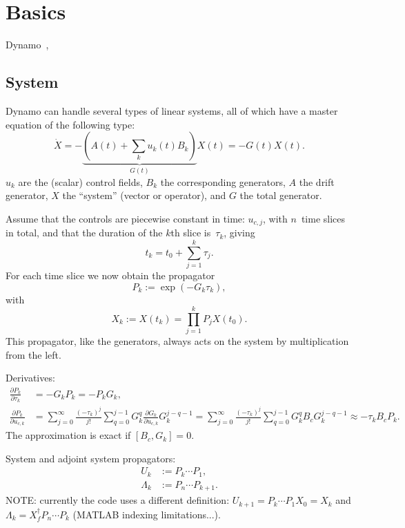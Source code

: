 \documentclass[aps, pra, a4paper, longbibliography]{revtex4}
\newcommand{\be}{\begin{equation}}
\newcommand{\ee}{\end{equation}}
\newcommand{\comm}[2]{\left[ #1, #2 \right]}
\newcommand{\dd}[2]{\frac{\partial #1}{\partial #2}}
\begin{document}
\tableofcontents

\section{Basics}

Dynamo~\cite{machnes_2011},


\subsection{System}

Dynamo can handle several types of linear systems, all of which have a
master equation of the following type:
\be
\label{eq:master}
\dot{X} = -\underbrace{(A(t) +\sum_k u_k(t) B_k)}_{G(t)} X(t) = -G(t) X(t).
\ee
$u_k$ are the (scalar) control fields, $B_k$ the corresponding generators,
$A$ the drift generator, $X$ the ``system'' (vector or operator), and $G$ the total generator.

Assume that the controls are
piecewise constant in time: $u_{c,j}$, with $n$~time slices in total,
and that the duration of the $k$th slice is~$\tau_k$, giving
\be
t_k = t_0 + \sum_{j=1}^{k} \tau_j.
\ee
For each time slice we now obtain the propagator
\be
P_k := \exp(-G_k \tau_k),
\ee
with
\be
X_k := X(t_k) = \prod_{j=1}^{k} P_j X(t_0).
\ee
This propagator, like the generators, always acts on the system by multiplication
from the left.

Derivatives:
\begin{align}
\dd{P_k}{\tau_k}  &= -G_k P_k = -P_k G_k,\\
\dd{P_k}{u_{c,k}}
&=
\sum_{j=0}^{\infty} \frac{(-\tau_k)^j}{j!}
\sum_{q=0}^{j-1}
G_k^{q} \dd{G_k}{u_{c,k}} G_k^{j-q-1}
=
\sum_{j=0}^{\infty} \frac{(-\tau_k)^j}{j!}
\sum_{q=0}^{j-1}
G_k^{q} B_c G_k^{j-q-1}
\approx -\tau_k B_c P_k.
\end{align}
The approximation is exact if $\comm{B_c}{G_k} = 0$.


System and adjoint system propagators:
\begin{align}
U_k &:= P_k \cdots P_1,\\      %
\Lambda_k &:= P_n \cdots P_{k+1}.
\end{align}
NOTE: currently the code uses a different definition:
$U_{k+1} = P_k \cdots P_1 X_0 = X_k$ and
$\Lambda_k = X_f^\dagger P_n \cdots P_k$ (MATLAB indexing limitations...).
\end{document}
